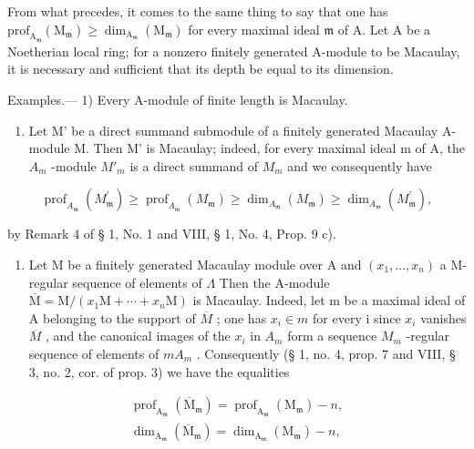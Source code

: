 From what precedes, it comes to the same thing to say that one has \(\mathrm{prof}_{\mathrm{A}_{\mathfrak{m}}}\left(\mathrm{M}_{\mathfrak{m}}\right) \geqslant \dim_{\mathrm{A}_{\mathfrak{m}}}\left(\mathrm{M}_{\mathfrak{m}}\right)\) for every maximal ideal \(\mathfrak{m}\) of A. Let A be a Noetherian local ring; for a nonzero finitely generated A-module to be Macaulay, it is necessary and sufficient that its depth be equal to its dimension.

Examples.--- 1) Every A-module of finite length is Macaulay.

\begin{enumerate}
\def\labelenumi{\arabic{enumi})}
\setcounter{enumi}{1}
\tightlist
\item
  Let M' be a direct summand submodule of a finitely generated Macaulay A-module M. Then M' is Macaulay; indeed, for every maximal ideal m of A, the \(A_{m}\) -module \(M'_{m}\) is a direct summand of \(M_{m}\) and we consequently have
\end{enumerate}

\[
\operatorname{prof} _ {A _ {\mathfrak {m}}} \left(M _ {\mathfrak {m}} ^ {\prime}\right) \geqslant \operatorname{prof} _ {A _ {\mathfrak {m}}} \left(M _ {\mathfrak {m}}\right) \geqslant \dim_ {A _ {\mathfrak {m}}} \left(M _ {\mathfrak {m}}\right) \geqslant \dim_ {A _ {\mathfrak {m}}} \left(M _ {\mathfrak {m}} ^ {\prime}\right),
\]

by Remark 4 of § 1, No. 1 and VIII, § 1, No. 4, Prop. 9 c).

\begin{enumerate}
\def\labelenumi{\arabic{enumi})}
\setcounter{enumi}{2}
\tightlist
\item
  Let M be a finitely generated Macaulay module over A and \((x_{1},\ldots,x_{n})\) a M-regular sequence of elements of \(\Lambda\) Then the A-module \(\overline{\mathrm{M}}=\mathrm{M}/(x_{1}\mathrm{M}+\cdots+x_{n}\mathrm{M})\) is Macaulay. Indeed, let m be a maximal ideal of A belonging to the support of \(\overline{M}\) ; one has \(x_{i}\in m\) for every i since \(x_{i}\) vanishes \(\overline{M}\) , and the canonical images of the \(x_{i}\) in \(A_{m}\) form a sequence \(M_{m}\) -regular sequence of elements of \(mA_{m}\) . Consequently (§ 1, no. 4, prop. 7 and VIII, § 3, no. 2, cor. of prop. 3) we have the equalities
\end{enumerate}

\[
\begin{array}{l} \operatorname{prof} _ {\mathrm{A} _ {\mathfrak {m}}} (\overline {{\mathrm{M}}} _ {\mathfrak {m}}) = \operatorname{prof} _ {\mathrm{A} _ {\mathfrak {m}}} (\mathrm{M} _ {\mathfrak {m}}) - n, \\ \dim_ {\mathrm{A} _ {\mathfrak {m}}} (\overline {{\mathrm{M}}} _ {\mathfrak {m}}) = \dim_ {\mathrm{A} _ {\mathfrak {m}}} (\mathrm{M} _ {\mathfrak {m}}) - n, \end{array}
\]

